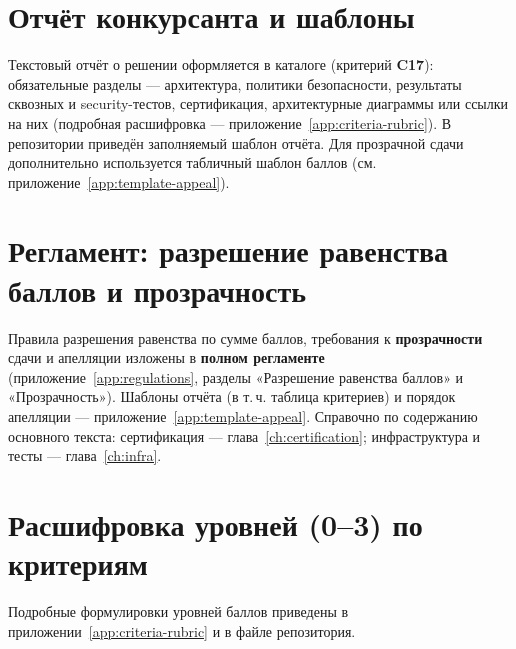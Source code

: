 \section{Отчёт конкурсанта и шаблоны}

Текстовый отчёт о решении оформляется в каталоге  (критерий \textbf{C17}): обязательные разделы --- архитектура, политики безопасности, результаты сквозных и security-тестов, сертификация, архитектурные диаграммы или ссылки на них (подробная расшифровка --- приложение~\ref{app:criteria-rubric}). В репозитории приведён заполняемый шаблон отчёта. Для прозрачной сдачи дополнительно используется табличный шаблон баллов  (см. приложение~\ref{app:template-appeal}).

\section{Регламент: разрешение равенства баллов и прозрачность}

Правила разрешения равенства по сумме баллов, требования к \textbf{прозрачности} сдачи и апелляции изложены в \textbf{полном регламенте} (приложение~\ref{app:regulations}, разделы «Разрешение равенства баллов» и «Прозрачность»). Шаблоны отчёта (в т.\,ч. таблица критериев) и порядок апелляции --- приложение~\ref{app:template-appeal}. Справочно по содержанию основного текста: сертификация --- глава~\ref{ch:certification}; инфраструктура и тесты --- глава~\ref{ch:infra}.

\section{Расшифровка уровней (0--3) по критериям}

Подробные формулировки уровней баллов приведены в приложении~\ref{app:criteria-rubric} и в файле  репозитория.
